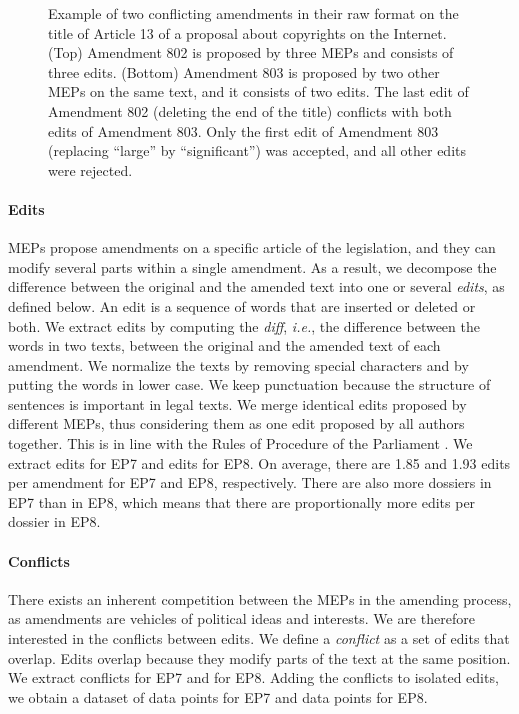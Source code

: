 \begin{figure}
  \centering
	\newcommand{\imgscale}{\linewidth*3/4}
	{%
		\setlength{\fboxsep}{5.5pt}%
		\setlength{\fboxrule}{0.5pt}%
	}%
	\vfill
	\vspace{4pt}
	{%
		\setlength{\fboxsep}{5.5pt}%
		\setlength{\fboxrule}{0.5pt}%
	}%
	\caption{
		Example of two conflicting amendments in their raw format on the title of Article 13 of a proposal about copyrights on the Internet.
		(Top) Amendment 802 is proposed by three MEPs and consists of three edits.
		(Bottom) Amendment 803 is proposed by two other MEPs on the same text, and it consists of two edits.
		The last edit of Amendment 802 (deleting the end of the title) conflicts with both edits of Amendment 803.
		Only the first edit of Amendment 803 (replacing ``large'' by ``significant'') was accepted, and all other edits were rejected.
	}
	\label{lmp:fig:amendment}
\end{figure}

\paragraph{Edits}
MEPs propose amendments on a specific article of the legislation, and they can modify several parts within a single amendment.
As a result, we decompose the difference between the original and the amended text into one or several \emph{edits}, as defined below.
An edit is a sequence of words that are inserted or deleted or both.
We extract edits by computing the \emph{diff}, \textit{i.e.}, the difference between the words in two texts, between the original and the amended text of each amendment.
We normalize the texts by removing special characters and by putting the words in lower case.
We keep punctuation because the structure of sentences is important in legal texts.
We merge identical edits proposed by different MEPs, thus considering them as one edit proposed by all authors together.
This is in line with the Rules of Procedure of the Parliament \cite{europarl2018rules}.
We extract  edits for EP7 and  edits for EP8.
On average, there are 1.85 and 1.93 edits per amendment for EP7 and EP8, respectively.
There are also more dossiers in EP7 than in EP8, which means that there are proportionally more edits per dossier in EP8.

\paragraph{Conflicts}
There exists an inherent competition between the MEPs in the amending process, as amendments are vehicles of political ideas and interests.
We are therefore interested in the conflicts between edits.
We define a \emph{conflict} as a set of edits that overlap.
Edits overlap because they modify parts of the text at the same position.
We extract  conflicts for EP7 and  for EP8.
Adding the conflicts to isolated edits, we obtain a dataset of  data points for EP7 and  data points for EP8.


